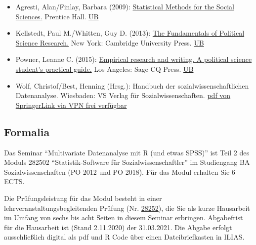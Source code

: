 \documentclass[
]{article}
\providecommand{\tightlist}{%
  \setlength{\itemsep}{0pt}\setlength{\parskip}{0pt}}
\begin{document}
\begin{itemize}
\tightlist
\item
  Agresti, Alan/Finlay, Barbara (2009):
  \href{https://www.pearson.com/us/higher-education/program/Agresti-Statistical-Methods-for-the-Social-Sciences-5th-Edition/PGM334444.html}{Statistical
  Methods for the Social Sciences.} Prentice Hall.
  \href{https://stg.ibs-bw.de/aDISWeb/app?service=direct/0/Home/$DirectLink\&sp=SOPAC02\&sp=SAKSWB-IdNr54555618X}{UB}
\item
  Kellstedt, Paul M./Whitten, Guy D. (2013):
  \href{https://www.cambridge.org/core/books/fundamentals-of-political-science-research/D216914982BC901C8E50461818D387A7}{The
  Fundamentals of Political Science Research.} New York: Cambridge
  University Press.
  \href{https://stg.ibs-bw.de/aDISWeb/app?service=direct/0/Home/$DirectLink\&sp=SOPAC02\&sp=SAKSWB-IdNr733649246}{UB}
\item
  Powner, Leanne C. (2015):
  \href{https://uk.sagepub.com/en-gb/eur/book/empirical-research-and-writing}{Empirical
  research and writing. A political science student's practical guide.}
  Los Angeles: Sage CQ Press.
  \href{https://stg.ibs-bw.de/aDISWeb/app?service=direct/0/Home/$DirectLink\&sp=SOPAC02\&sp=SAKSWB-IdNr1616376724}{UB}
\item
  Wolf, Christof/Best, Henning (Hrsg.): Handbuch der
  sozialwissenschaftlichen Datenanalyse. Wiesbaden: VS Verlag für
  Sozialwissenschaften.
  \href{https://link.springer.com/book/10.1007/978-3-531-92038-2}{pdf
  von SpringerLink via VPN frei verfügbar}
\end{itemize}

\hypertarget{formalia}{%
\subsection{Formalia}\label{formalia}}

Das Seminar ``Multivariate Datenanalyse mit R (und etwas SPSS)'' ist
Teil 2 des Moduls 282502 ``Statistik-Software für
Sozialwissenschaftler'' im Studiengang BA Sozialwissenschaften (PO 2012
und PO 2018). Für das Modul erhalten Sie 6 ECTS.

Die Prüfungsleistung für das Modul besteht in einer
lehrveranstaltungsbegleitenden Prüfung (Nr.
\href{https://campus.uni-stuttgart.de/cusonline/pl/ui/$ctx/wbLv.wbShowLVDetail?pStpSpNr=273461}{28252}),
die Sie als kurze Hausarbeit im Umfang von sechs bis acht Seiten in
diesem Seminar erbringen. Abgabefrist für die Hausarbeit ist (Stand
2.11.2020) der 31.03.2021. Die Abgabe erfolgt ausschließlich digital als
pdf und R Code über einen Dateibriefkasten in ILIAS.
\end{document}
